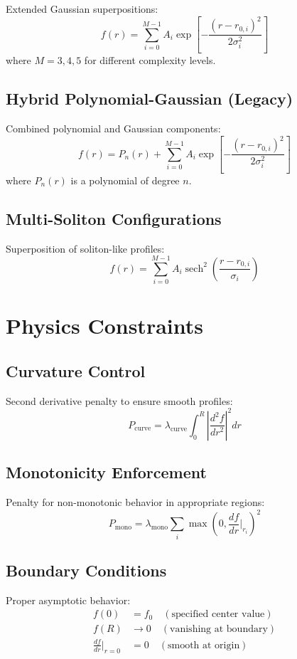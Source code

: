 \documentclass[12pt]{article}
\begin{document}
Extended Gaussian superpositions:
\[
f(r) = \sum_{i=0}^{M-1} A_i \exp\left[-\frac{(r-r_{0,i})^2}{2\sigma_i^2}\right]
\]
where \(M = 3, 4, 5\) for different complexity levels.

\subsection{Hybrid Polynomial-Gaussian (Legacy)}

Combined polynomial and Gaussian components:
\[
f(r) = P_n(r) + \sum_{i=0}^{M-1} A_i \exp\left[-\frac{(r-r_{0,i})^2}{2\sigma_i^2}\right]
\]
where \(P_n(r)\) is a polynomial of degree \(n\).

\subsection{Multi-Soliton Configurations}

Superposition of soliton-like profiles:
\[
f(r) = \sum_{i=0}^{M-1} A_i \operatorname{sech}^2\left(\frac{r-r_{0,i}}{\sigma_i}\right)
\]

\section{Physics Constraints}

\subsection{Curvature Control}

Second derivative penalty to ensure smooth profiles:
\[
P_{\text{curve}} = \lambda_{\text{curve}} \int_0^R \left|\frac{d^2 f}{dr^2}\right|^2 dr
\]

\subsection{Monotonicity Enforcement}

Penalty for non-monotonic behavior in appropriate regions:
\[
P_{\text{mono}} = \lambda_{\text{mono}} \sum_{i} \max\left(0, \frac{df}{dr}\bigg|_{r_i}\right)^2
\]

\subsection{Boundary Conditions}

Proper asymptotic behavior:
\begin{align}
f(0) &= f_0 \quad (\text{specified center value}) \\
f(R) &\to 0 \quad (\text{vanishing at boundary}) \\
\frac{df}{dr}\bigg|_{r=0} &= 0 \quad (\text{smooth at origin})
\end{align}
\end{document}
